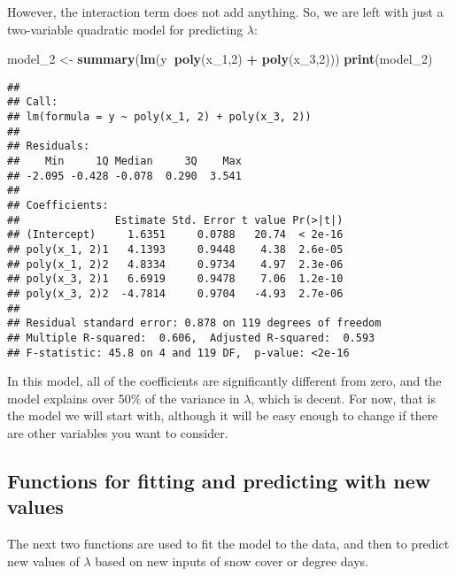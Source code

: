 \documentclass[]{article}
\newenvironment{Shaded}{\begin{snugshade}}{\end{snugshade}}
\newcommand{\DecValTok}[1]{\textcolor[rgb]{0.00,0.00,0.81}{#1}}
\newcommand{\KeywordTok}[1]{\textcolor[rgb]{0.13,0.29,0.53}{\textbf{#1}}}
\newcommand{\NormalTok}[1]{#1}
\newcommand{\OperatorTok}[1]{\textcolor[rgb]{0.81,0.36,0.00}{\textbf{#1}}}
\newcommand{\StringTok}[1]{\textcolor[rgb]{0.31,0.60,0.02}{#1}}
\begin{document}
However, the interaction term does not add anything. So, we are left
with just a two-variable quadratic model for predicting \(\lambda\):

\begin{Shaded}
\begin{Highlighting}[]
\NormalTok{model_}\DecValTok{2}\NormalTok{ <-}\StringTok{ }\KeywordTok{summary}\NormalTok{(}\KeywordTok{lm}\NormalTok{(y}\OperatorTok{~}\KeywordTok{poly}\NormalTok{(x_}\DecValTok{1}\NormalTok{,}\DecValTok{2}\NormalTok{) }\OperatorTok{+}\StringTok{ }\KeywordTok{poly}\NormalTok{(x_}\DecValTok{3}\NormalTok{,}\DecValTok{2}\NormalTok{)))}
\KeywordTok{print}\NormalTok{(model_}\DecValTok{2}\NormalTok{)}
\end{Highlighting}
\end{Shaded}

\begin{verbatim}
## 
## Call:
## lm(formula = y ~ poly(x_1, 2) + poly(x_3, 2))
## 
## Residuals:
##    Min     1Q Median     3Q    Max 
## -2.095 -0.428 -0.078  0.290  3.541 
## 
## Coefficients:
##               Estimate Std. Error t value Pr(>|t|)
## (Intercept)     1.6351     0.0788   20.74  < 2e-16
## poly(x_1, 2)1   4.1393     0.9448    4.38  2.6e-05
## poly(x_1, 2)2   4.8334     0.9734    4.97  2.3e-06
## poly(x_3, 2)1   6.6919     0.9478    7.06  1.2e-10
## poly(x_3, 2)2  -4.7814     0.9704   -4.93  2.7e-06
## 
## Residual standard error: 0.878 on 119 degrees of freedom
## Multiple R-squared:  0.606,  Adjusted R-squared:  0.593 
## F-statistic: 45.8 on 4 and 119 DF,  p-value: <2e-16
\end{verbatim}

In this model, all of the coefficients are significantly different from
zero, and the model explains over 50\% of the variance in \(\lambda\),
which is decent. For now, that is the model we will start with, although
it will be easy enough to change if there are other variables you want
to consider.

\hypertarget{functions-for-fitting-and-predicting-with-new-values}{%
\subsection{Functions for fitting and predicting with new
values}\label{functions-for-fitting-and-predicting-with-new-values}}

The next two functions are used to fit the model to the data, and then
to predict new values of \(\lambda\) based on new inputs of snow cover
or degree days.
\end{document}
